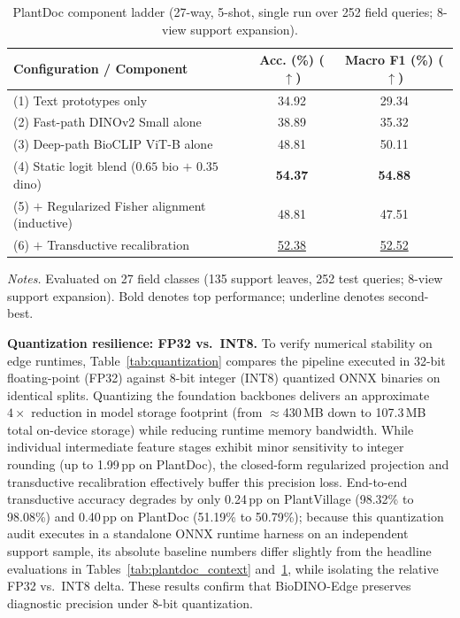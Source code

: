 \documentclass[preprint,12pt]{elsarticle}
\begin{document}
\begin{table}[htbp]
\caption{PlantDoc component ladder (27-way, 5-shot, single run over 252 field queries; 8-view support expansion).}
\label{tab:plantdoc_ablation}
\centering

\footnotesize
\setlength{\tabcolsep}{3pt}
\begin{tabular*}{\columnwidth}{@{\extracolsep{\fill}}lcc}
\toprule
\textbf{Configuration / Component} & \textbf{Acc. (\%) ($\uparrow$)} & \textbf{Macro F1 (\%) ($\uparrow$)} \\
\midrule
(1) Text prototypes only & 34.92 & 29.34 \\
(2) Fast-path DINOv2 Small alone & 38.89 & 35.32 \\
(3) Deep-path BioCLIP ViT-B alone & 48.81 & 50.11 \\
(4) Static logit blend ($0.65$ bio $+$ $0.35$ dino) & \textbf{54.37} & \textbf{54.88} \\
(5) $+$ Regularized Fisher alignment (inductive) & 48.81 & 47.51 \\
(6) $+$ Transductive recalibration & \underline{52.38} & \underline{52.52} \\
\bottomrule
\end{tabular*}

\vspace{3pt}
\begin{minipage}{\columnwidth}
\footnotesize
\textit{Notes.} Evaluated on 27 field classes (135 support leaves, 252 test queries; 8-view support expansion). Bold denotes top performance; underline denotes second-best.
\end{minipage}
\end{table}

\textbf{Quantization resilience: FP32 vs.\ INT8.} To verify numerical stability on edge runtimes, Table~\ref{tab:quantization} compares the pipeline executed in 32-bit floating-point (FP32) against 8-bit integer (INT8) quantized ONNX binaries on identical splits. Quantizing the foundation backbones delivers an approximate $4\times$ reduction in model storage footprint (from $\approx$430\,MB down to 107.3\,MB total on-device storage) while reducing runtime memory bandwidth. While individual intermediate feature stages exhibit minor sensitivity to integer rounding (up to 1.99\,pp on PlantDoc), the closed-form regularized projection and transductive recalibration effectively buffer this precision loss. End-to-end transductive accuracy degrades by only 0.24\,pp on PlantVillage (98.32\% to 98.08\%) and 0.40\,pp on PlantDoc (51.19\% to 50.79\%); because this quantization audit executes in a standalone ONNX runtime harness on an independent support sample, its absolute baseline numbers differ slightly from the headline evaluations in Tables~\ref{tab:plantdoc_context} and~\ref{tab:plantdoc_ablation}, while isolating the relative FP32 vs.\ INT8 delta. These results confirm that BioDINO-Edge preserves diagnostic precision under 8-bit quantization.
\end{document}
